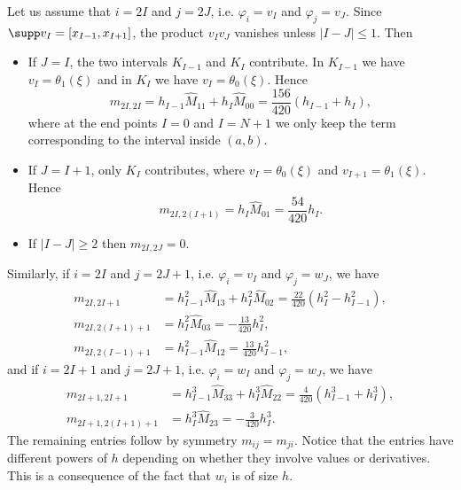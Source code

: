 Let us assume that $i = 2 I$ and $j = 2 J$, i.e. $\varphi_i = v_I$ and $\varphi_j = v_J$.
Since $\supp v_I = [x_{I-1}, x_{I+1}]$, the product $v_I v_J$ vanishes unless $|I - J| \le 1$.
Then
\begin{itemize}
    \item If $J = I$, the two intervals $K_{I-1}$ and $K_I$ contribute. In $K_{I-1}$ we have $v_I = \theta_1(\xi)$ and in $K_I$ we have $v_I = \theta_0(\xi)$. Hence
          \begin{equation*}
              m_{2I, 2I} = h_{I-1} \widehat M_{11} + h_{I} \widehat M_{00} = \frac{156}{420} (h_{I-1} + h_I),
          \end{equation*}
          where at the end points $I = 0$ and $I = N+1$ we only keep the term corresponding to the interval inside $(a,b)$.
    \item If $J = I + 1$, only $K_I$ contributes, where $v_I = \theta_0(\xi)$ and $v_{I+1} = \theta_1(\xi)$. Hence
          \begin{equation*}
              m_{2I, 2(I+1)} = h_I \widehat M_{01} = \frac{54}{420} h_I.
          \end{equation*}
    \item If $|I - J| \ge 2$ then $m_{2I, 2J} = 0$.
\end{itemize}
Similarly, if $i = 2I$ and $j = 2J + 1$, i.e. $\varphi_i = v_I$ and $\varphi_j = w_J$, we have
\begin{align*}
    m_{2I, 2I+1}     & = h_{I-1}^2 \widehat M_{13} + h_I^2 \widehat M_{02} = \frac{22}{420} (h_I^2 - h_{I-1}^2), \\
    m_{2I, 2(I+1)+1} & = h_I^2 \widehat M_{03} = -\frac{13}{420} h_I^2,                                          \\
    m_{2I, 2(I-1)+1} & = h_{I-1}^2 \widehat M_{12} = \frac{13}{420} h_{I-1}^2,
\end{align*}
and if $i = 2I + 1$ and $j = 2J+1$, i.e. $\varphi_i = w_I$ and $\varphi_j = w_J$, we have
\begin{align*}
    m_{2I+1, 2I+1}     & = h_{I-1}^3 \widehat M_{33} + h_I^3 \widehat M_{22} = \frac{4}{420} (h_{I-1}^3 + h_I^3), \\
    m_{2I+1, 2(I+1)+1} & = h_I^3 \widehat M_{23} = -\frac{3}{420} h_I^3.
\end{align*}
The remaining entries follow by symmetry $m_{ij} = m_{ji}$.
Notice that the entries have different powers of $h$ depending on whether they involve values or derivatives. This is a consequence of the fact that $w_i$ is of size $h$.

